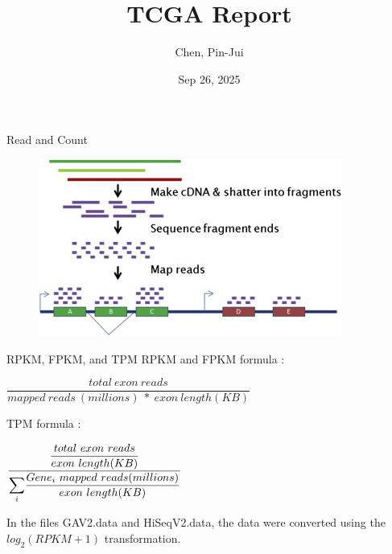 \documentclass[12pt, aspectratio=43]{beamer}
\title[\textbf{TCGA Report}]{TCGA Report}
\author[Chen, Pin-Jui]{Chen, Pin-Jui}
\date[Sep 26, 2025]{Sep 26, 2025}
\begin{document}
	
	\begin{frame}
		\titlepage
	\end{frame}
	
	\begin{frame}{Read and Count}
		\begin{figure}[h!]
			\centering
			\includegraphics[width=\linewidth]{Read.jpg}
		\end{figure}
	\end{frame}
	
	\begin{frame}{RPKM, FPKM, and TPM}
		RPKM and FPKM formula :
		\begin{center}
			$\dfrac{total \ exon \ reads}{mapped \ reads \ (millions) \ * \ exon \ length (KB)}$
			\end{center}
		TPM formula :
		\begin{center}
			$\dfrac{\dfrac{total \ exon \ reads}{exon \ length(KB)}}{\mathlarger{\sum_{i}}\dfrac{Gene_i \ mapped \ reads (millions)}{exon \ length (KB)}}$
		\end{center}
		In the files GAV2.data and HiSeqV2.data, the data were converted using the $log_2(RPKM + 1)$ transformation.
	\end{frame}
	
\end{document}
